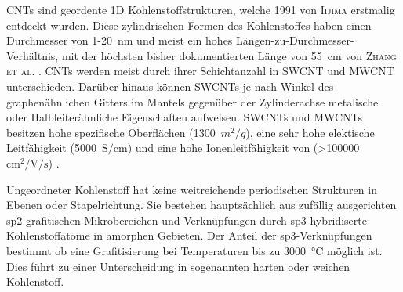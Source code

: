 CNTs sind geordente 1D Kohlenstoffstrukturen, welche 1991 von \textsc{Iijima} \cite{Iijima1991} erstmalig entdeckt wurden. Diese zylindrischen Formen des Kohlenstoffes haben einen Durchmesser von 1-20~$\si{\nano\metre}$  und meist ein hohes Längen-zu-Durchmesser-Verhältnis, mit der höchsten bisher dokumentierten Länge von 55~$\si{\centi\metre}$ von \textsc{Zhang et al.} \cite{Zhang2013}. CNTs werden meist durch ihrer Schichtanzahl in SWCNT und MWCNT unterschieden. Darüber hinaus können SWCNTs je nach Winkel des graphenähnlichen Gitters im Mantels gegenüber der Zylinderachse metalische oder Halbleiterähnliche Eigenschaften aufweisen. 
SWCNTs und MWCNTs besitzen hohe spezifische Oberflächen (1300~$m^2/g$), eine sehr hohe elektische Leitfähigkeit (5000~$\si{\siemens \per \cm}$) und eine hohe Ionenleitfähigkeit von (>100000~$\si{\cm \squared \per \V \per \s}$) \cite{Xu2011,Uetani2014,Charlier2007}.

Ungeordneter Kohlenstoff hat keine weitreichende periodischen Strukturen in Ebenen oder Stapelrichtung. Sie bestehen hauptsächlich aus zufällig ausgerichten sp2 grafitischen Mikrobereichen und Verknüpfungen durch sp3 hybridiserte Kohlenstoffatome in amorphen Gebieten. Der Anteil der sp3-Verknüpfungen bestimmt ob eine Grafitisierung bei Temperaturen bis zu 3000~$\si{\degreeCelsius}$ möglich ist. Dies führt zu einer Unterscheidung in sogenannten harten oder weichen Kohlenstoff. 

